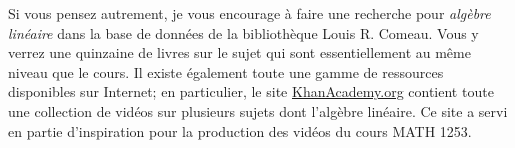 \documentclass[11pt]{article}
\begin{document}
Si vous pensez autrement, je vous encourage à faire une recherche pour \textit{algèbre linéaire} dans la base de données 
de la bibliothèque Louis R. Comeau.  Vous y verrez une quinzaine de livres sur le sujet qui sont essentiellement au même niveau
que le cours.  Il existe également toute une gamme de ressources disponibles sur Internet; en particulier, le site \url{KhanAcademy.org}
contient toute une collection de vidéos sur plusieurs sujets dont l'algèbre linéaire.  Ce site a servi en partie d'inspiration
pour la production des vidéos du cours MATH 1253.
\end{document}
